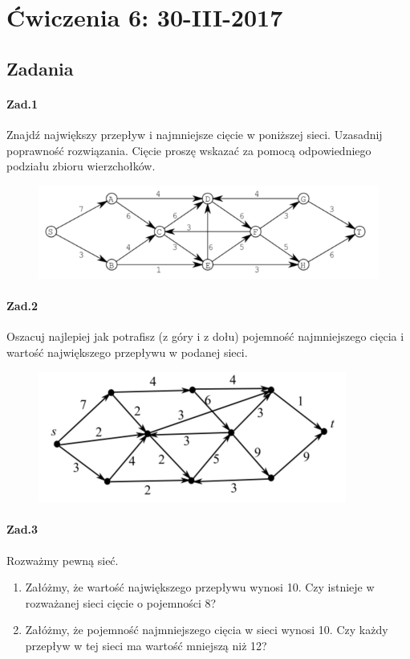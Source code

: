 \section{Ćwiczenia 6: 30-III-2017}
\subsection{Zadania}
\paragraph{Zad.1} Znajdź największy przepływ i najmniejsze cięcie w poniższej sieci. Uzasadnij poprawność rozwiązania. Cięcie proszę wskazać za pomocą odpowiedniego podziału zbioru wierzchołków.
\begin{figure}[H]
\centering
\includegraphics[width=.8\textwidth]{img/6_Z1}
\end{figure}

\paragraph{Zad.2} Oszacuj najlepiej jak potrafisz (z góry i z dołu) pojemność najmniejszego cięcia i wartość największego przepływu w podanej sieci.
\begin{figure}[H]
\centering
\includegraphics[width=.8\textwidth]{img/6_Z2}
\end{figure}

\paragraph{Zad.3} Rozważmy pewną sieć.
\begin{enumerate}[label=\alph*)]
\item Załóżmy, że wartość największego przepływu wynosi 10. Czy istnieje w rozważanej sieci cięcie o pojemności 8?
\item Załóżmy, że pojemność najmniejszego cięcia w sieci wynosi 10. Czy każdy przepływ w tej sieci ma wartość mniejszą niż 12?
\end{enumerate}


